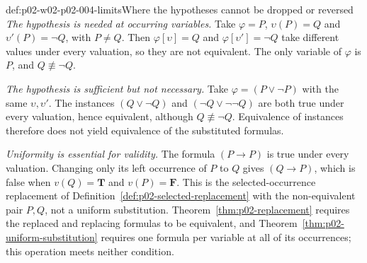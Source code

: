 \begin{hbexample}{def:p02-w02-p02-004-limits}{Where the hypotheses cannot be dropped or reversed}
\emph{The hypothesis is needed at occurring variables.}  Take
\(\varphi=P\), \(\upsilon(P)=Q\) and \(\upsilon'(P)=\neg Q\), with \(P\neq Q\).
Then \(\varphi[\upsilon]=Q\) and \(\varphi[\upsilon']=\neg Q\) take different
values under every valuation, so they are not equivalent.  The only variable
of \(\varphi\) is \(P\), and \(Q\not\equiv\neg Q\).

\emph{The hypothesis is sufficient but not necessary.}  Take
\(\varphi=(P\lor\neg P)\) with the same \(\upsilon,\upsilon'\).  The instances
\((Q\lor\neg Q)\) and \((\neg Q\lor\neg\neg Q)\) are both true under every
valuation, hence equivalent, although \(Q\not\equiv\neg Q\).  Equivalence of
instances therefore does not yield equivalence of the substituted formulas.

\emph{Uniformity is essential for validity.}  The formula \((P\to P)\) is
true under every valuation.  Changing only its left occurrence of \(P\) to
\(Q\) gives \((Q\to P)\), which is false when \(v(Q)=\mathbf T\) and
\(v(P)=\mathbf F\).  This is the selected-occurrence replacement of
Definition~\ref{def:p02-selected-replacement} with the non-equivalent pair
\(P,Q\), not a uniform substitution.  Theorem~\ref{thm:p02-replacement}
requires the replaced and replacing formulas to be equivalent, and
Theorem~\ref{thm:p02-uniform-substitution} requires one formula per
variable at all of its occurrences; this operation meets neither condition.
\end{hbexample}

